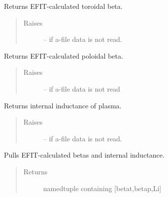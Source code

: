 \documentclass[letterpaper,10pt,english]{sphinxmanual}
\begin{document}
\begin{fulllineitems}
\begin{fulllineitems}
\label{eqtools:eqtools.eqdskreader.EqdskReader.getBetaT}
Returns EFIT-calculated toroidal beta.
\begin{quote}\begin{description}
\item[{Raises }] \leavevmode
{} -- 
if a-file data is not read.

\end{description}\end{quote}

\end{fulllineitems}


\begin{fulllineitems}
\label{eqtools:eqtools.eqdskreader.EqdskReader.getBetaP}
Returns EFIT-calculated poloidal beta.
\begin{quote}\begin{description}
\item[{Raises }] \leavevmode
{} -- 
if a-file data is not read

\end{description}\end{quote}

\end{fulllineitems}


\begin{fulllineitems}
\label{eqtools:eqtools.eqdskreader.EqdskReader.getLi}
Returns internal inductance of plasma.
\begin{quote}\begin{description}
\item[{Raises }] \leavevmode
{} -- 
if a-file data is not read.

\end{description}\end{quote}

\end{fulllineitems}


\begin{fulllineitems}
\label{eqtools:eqtools.eqdskreader.EqdskReader.getBetas}
Pulls EFIT-calculated betas and internal inductance.
\begin{quote}\begin{description}
\item[{Returns}] \leavevmode
namedtuple containing {[}betat,betap,Li{]}


\end{description}
\end{quote}
\end{fulllineitems}
\end{fulllineitems}
\end{document}
